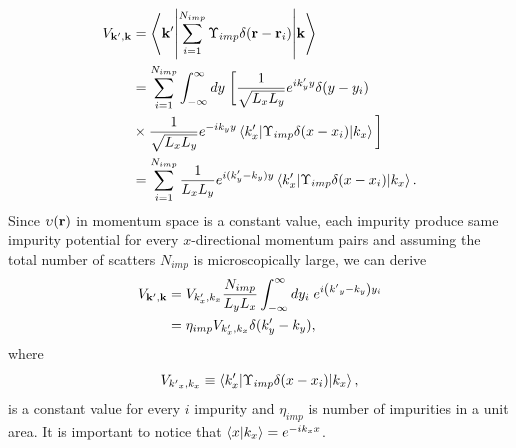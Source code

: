 \begin{subequations} \label{eq_c24}
\begin{align}
 V_{\vb{k'},\vb{k}} & =
 \mel**{\vb{k'}}{\sum_{i=1}^{N_{imp}}
 \Upsilon_{imp} \delta(\vb{r}-\vb{r}_i)}{\vb{k}} \label{eq_c24a} \\
 & =
 \sum_{i=1}^{N_{imp}}
 \int_{-\infty}^{\infty} dy\; \bigg[
 \frac{1}{\sqrt{L_xL_y}} e^{ik'_y y} \delta(y-y_i) \nonumber \\
 & \times \frac{1}{\sqrt{L_xL_y}} e^{-i{k}_y y}
 \mel**{k'_x}{\Upsilon_{imp} \delta(x-x_i)}{k_x} \bigg] \label{eq_c24b} \\
  & =
 \sum_{i=1}^{N_{imp}} \frac{1}{{L_xL_y}}
 e^{i(k'_y - k_y )y}
 \mel**{k'_x}{\Upsilon_{imp} \delta(x-x_i)}{k_x} \label{eq_c24c}.
\end{align}
\end{subequations}
Since $\upsilon (\vb{r})$ in momentum space is a constant value, each impurity  produce same impurity potential for every $x$-directional momentum pairs and assuming the total number of scatters $N_{imp}$ is microscopically large, we can derive
\begin{subequations} \label{eq_c25}
  \begin{align}
    V_{\vb{k'},\vb{k}}
    & =
    V_{k'_x,k_x}
    \frac{N_{imp}}{L_y L_x} \int_{-\infty}^{\infty} dy_i\;
    e^{i\qty({k'}_y - k_y)y_i} \label{eq_c25a} \\
    & =
    \eta_{imp} V_{k'_x,k_x} \delta(k'_y - k_y), \label{eq_c25b}
  \end{align}
\end{subequations}
where
\begin{equation} \label{eq_c26}
  V_{{k'}_x,k_x} \equiv
  \mel**{k'_x}{\Upsilon_{imp} \delta(x-x_i)}{k_x},
\end{equation}
is a constant value for every $i$ impurity and $\eta_{imp}$ is number of impurities in a unit area. It is important to notice that $\braket{x}{k_x} = e^{-ik_xx}$.


